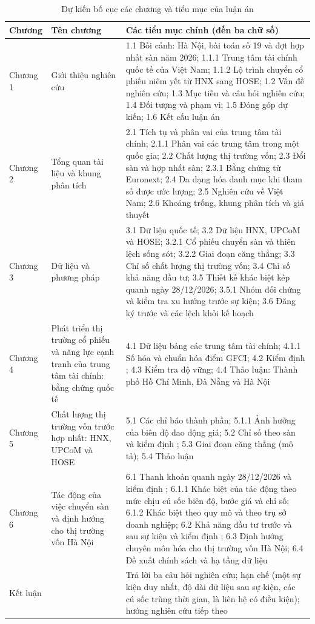 \begin{table}[H]
\myfloatalign
\caption{Dự kiến bố cục các chương và tiểu mục của luận án}\label{tab:bocuc}
{\bangnho
\begin{tabularx}{\textwidth}{@{}l >{\raggedright\arraybackslash}p{} L@{}}
\toprule
Chương & Tên chương & Các tiểu mục chính (đến ba chữ số)\\
\midrule
Chương 1 & Giới thiệu nghiên cứu & 1.1 Bối cảnh: Hà Nội, bài toán số 19 và đợt hợp nhất sàn năm 2026; 1.1.1 Trung tâm tài chính quốc tế của Việt Nam; 1.1.2 Lộ trình chuyển cổ phiếu niêm yết từ HNX sang HOSE; 1.2 Vấn đề nghiên cứu; 1.3 Mục tiêu và câu hỏi nghiên cứu; 1.4 Đối tượng và phạm vi; 1.5 Đóng góp dự kiến; 1.6 Kết cấu luận án\\
\addlinespace
Chương 2 & Tổng quan tài liệu và khung phân tích & 2.1 Tích tụ và phân vai của trung tâm tài chính; 2.1.1 Phân vai các trung tâm trong một quốc gia; 2.2 Chất lượng thị trường vốn; 2.3 Đổi sàn và hợp nhất sàn; 2.3.1 Bằng chứng từ Euronext; 2.4 Đa dạng hóa danh mục khi tham số được ước lượng; 2.5 Nghiên cứu về Việt Nam; 2.6 Khoảng trống, khung phân tích và giả thuyết\\
\addlinespace
Chương 3 & Dữ liệu và phương pháp & 3.1 Dữ liệu quốc tế; 3.2 Dữ liệu HNX, UPCoM và HOSE; 3.2.1 Cổ phiếu chuyển sàn và thiên lệch sống sót; 3.2.2 Giai đoạn căng thẳng; 3.3 Chỉ số chất lượng thị trường vốn; 3.4 Chỉ số khả năng đầu tư; 3.5 Thiết kế khác biệt kép quanh ngày 28/12/2026; 3.5.1 Nhóm đối chứng và kiểm tra xu hướng trước sự kiện; 3.6 Đăng ký trước và các lệch khỏi kế hoạch\\
\addlinespace
Chương 4 & Phát triển thị trường cổ phiếu và năng lực cạnh tranh của trung tâm tài chính: bằng chứng quốc tế & 4.1 Dữ liệu bảng các trung tâm tài chính; 4.1.1 Số hóa và chuẩn hóa điểm GFCI; 4.2 Kiểm định ; 4.3 Kiểm tra độ vững; 4.4 Thảo luận: Thành phố Hồ Chí Minh, Đà Nẵng và Hà Nội\\
\addlinespace
Chương 5 & Chất lượng thị trường vốn trước hợp nhất: HNX, UPCoM và HOSE & 5.1 Các chỉ báo thành phần; 5.1.1 Ảnh hưởng của biên độ dao động giá; 5.2 Chỉ số theo sàn và kiểm định ; 5.3 Giai đoạn căng thẳng (mô tả); 5.4 Thảo luận\\
\addlinespace
Chương 6 & Tác động của việc chuyển sàn và định hướng cho thị trường vốn Hà Nội & 6.1 Thanh khoản quanh ngày 28/12/2026 và kiểm định ; 6.1.1 Khác biệt của tác động theo mức chịu cú sốc biên độ, bước giá và chỉ số; 6.1.2 Khác biệt theo quy mô và theo trụ sở doanh nghiệp; 6.2 Khả năng đầu tư trước và sau sự kiện và kiểm định ; 6.3 Định hướng chuyên môn hóa cho thị trường vốn Hà Nội; 6.4 Đề xuất chính sách và hạ tầng dữ liệu\\
\addlinespace
Kết luận & & Trả lời ba câu hỏi nghiên cứu; hạn chế (một sự kiện duy nhất, độ dài dữ liệu sau sự kiện, các cú sốc trùng thời gian,  là liên hệ có điều kiện); hướng nghiên cứu tiếp theo\\
\bottomrule
\end{tabularx}}
\end{table}


